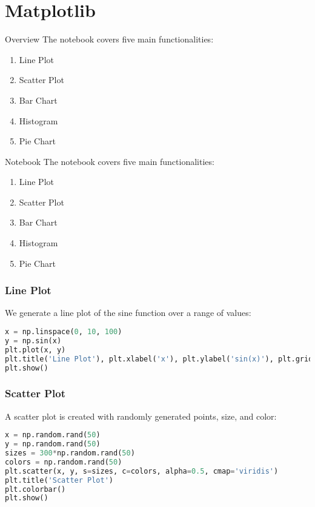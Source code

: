 \section{Matplotlib}

\begin{frame}[plain]
\sectionpage
\end{frame}


\begin{frame}{Overview}
The notebook covers five main functionalities:
\begin{enumerate}
\item Line Plot
\item Scatter Plot
\item Bar Chart
\item Histogram
\item Pie Chart
\end{enumerate}
\end{frame}




\begin{frame}{Notebook}
The notebook covers five main functionalities:
\begin{enumerate}
\item Line Plot
\item Scatter Plot
\item Bar Chart
\item Histogram
\item Pie Chart
\end{enumerate}
\end{frame}


\begin{frame}[fragile]
\frametitle{Line Plot}
We generate a line plot of the sine function over a range of values:

\begin{lstlisting}[language=python]
x = np.linspace(0, 10, 100)
y = np.sin(x)
plt.plot(x, y)
plt.title('Line Plot'), plt.xlabel('x'), plt.ylabel('sin(x)'), plt.grid(True)
plt.show()
\end{lstlisting}
\end{frame}


\begin{frame}[fragile]
\frametitle{Scatter Plot}
A scatter plot is created with randomly generated points, size, and color:

\begin{lstlisting}[language=Python]
x = np.random.rand(50)
y = np.random.rand(50)
sizes = 300*np.random.rand(50)
colors = np.random.rand(50)
plt.scatter(x, y, s=sizes, c=colors, alpha=0.5, cmap='viridis')
plt.title('Scatter Plot')
plt.colorbar()
plt.show()
\end{lstlisting}
\end{frame}


